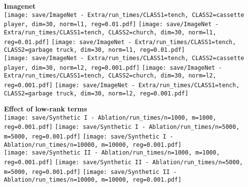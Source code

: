 {    \begin{minipage}[c]{0.48\textwidth}
        \centering
        \vspace{1em}
        {\bf\color{sufered} Imagenet} \\ \vspace{0.3em}
        \texttt{[image: save/ImageNet - Extra/run\_times/CLASS1=tench, CLASS2=cassette player, dim=30, norm=l1, reg=0.01.pdf]}
        \texttt{[image: save/ImageNet - Extra/run\_times/CLASS1=tench, CLASS2=church, dim=30, norm=l1, reg=0.01.pdf]}
        \texttt{[image: save/ImageNet - Extra/run\_times/CLASS1=tench, CLASS2=garbage truck, dim=30, norm=l1, reg=0.01.pdf]} \\
        \texttt{[image: save/ImageNet - Extra/run\_times/CLASS1=tench, CLASS2=cassette player, dim=30, norm=l2, reg=0.001.pdf]}
        \texttt{[image: save/ImageNet - Extra/run\_times/CLASS1=tench, CLASS2=church, dim=30, norm=l2, reg=0.001.pdf]}
        \texttt{[image: save/ImageNet - Extra/run\_times/CLASS1=tench, CLASS2=garbage truck, dim=30, norm=l2, reg=0.001.pdf]} \\
    \end{minipage}
    \hfill
    \begin{minipage}[c]{0.48\textwidth}
        \centering
        \vspace{1em}
        {\bf\color{sufered} Effect of low-rank terms} \\ \vspace{0.3em}
        \texttt{[image: save/Synthetic I - Ablation/run\_times/n=1000, m=1000, reg=0.001.pdf]}
        \texttt{[image: save/Synthetic I - Ablation/run\_times/n=5000, m=5000, reg=0.001.pdf]}
        \texttt{[image: save/Synthetic I - Ablation/run\_times/n=10000, m=10000, reg=0.001.pdf]} \\
        \texttt{[image: save/Synthetic II - Ablation/run\_times/n=1000, m=1000, reg=0.001.pdf]}
        \texttt{[image: save/Synthetic II - Ablation/run\_times/n=5000, m=5000, reg=0.001.pdf]}
        \texttt{[image: save/Synthetic II - Ablation/run\_times/n=10000, m=10000, reg=0.001.pdf]} \\
    \end{minipage}

}